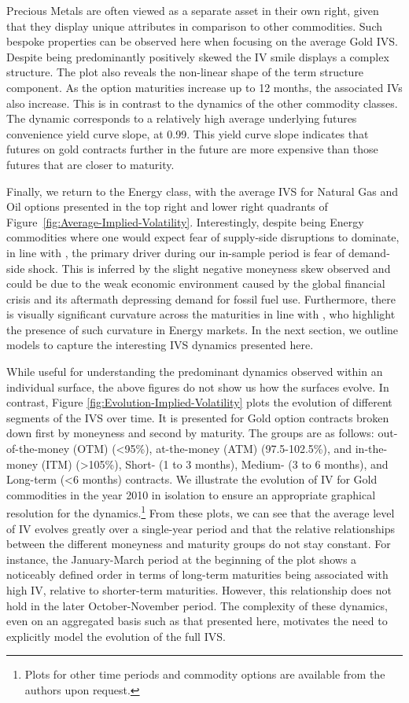 \documentclass[12pt,a4paper]{article}
\begin{document}
Precious Metals are often viewed as a separate asset in their own right, given that they display unique attributes in comparison to other commodities. Such bespoke properties can be observed here when focusing on the average Gold IVS. Despite being predominantly positively skewed the IV smile displays a complex structure. The plot also reveals the non-linear shape of the term structure component. As the option maturities increase up to 12 months, the associated IVs also increase. This is in contrast to the dynamics of the other commodity classes. The dynamic corresponds to a relatively high average underlying futures convenience yield curve slope, at 0.99. This yield curve slope indicates that futures on gold contracts further in the future are more expensive than those futures that are closer to maturity.

Finally, we return to the Energy class, with the average IVS for Natural Gas and Oil options presented in the top right and lower right quadrants of Figure~\ref{fig:Average-Implied-Volatility}. Interestingly, despite being Energy commodities where one would expect fear of supply-side disruptions to dominate, in line with \cite{doran2008computing}, the primary driver during our in-sample period is fear of demand-side shock. This is inferred by the slight negative moneyness skew observed and could be due to the weak economic environment caused by the global financial crisis and its aftermath depressing demand for fossil fuel use. Furthermore, there is visually significant curvature across the maturities in line with \cite{doran2008computing}, who highlight the presence of such curvature in Energy markets. In the next section, we outline models to capture the interesting IVS dynamics presented here.

While useful for understanding the predominant dynamics observed within an individual surface, the above figures do not show us how the surfaces evolve. In contrast, Figure \ref{fig:Evolution-Implied-Volatility} plots the evolution of different segments of the IVS over time. It is presented for Gold option contracts broken down first by moneyness and second by maturity. The groups are as follows: out-of-the-money (OTM) (<95\%), at-the-money (ATM) (97.5-102.5\%), and in-the-money (ITM) (>105\%), Short- (1 to 3 months), Medium- (3 to 6 months), and Long-term (<6 months) contracts. We illustrate the evolution of IV for Gold commodities in the year 2010 in isolation to ensure an appropriate graphical resolution for the dynamics.\footnote{Plots for other time periods and commodity options are available from the authors upon request.} From these plots, we can see that the average level of IV evolves greatly over a single-year period and that the relative relationships between the different moneyness and maturity groups do not stay constant. For instance, the January-March period at the beginning of the plot shows a noticeably defined order in terms of long-term maturities being associated with high IV, relative to shorter-term maturities. However, this relationship does not hold in the later October-November period. The complexity of these dynamics, even on an aggregated basis such as that presented here, motivates the need to explicitly model the evolution of the full IVS.
\end{document}
